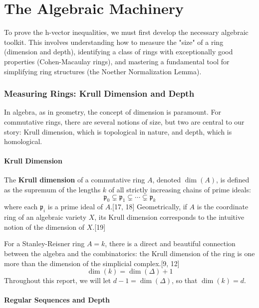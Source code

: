 \documentclass[11pt]{article}
\begin{document}
\part{The Algebraic Machinery}

To prove the h-vector inequalities, we must first develop the necessary algebraic toolkit. This involves understanding how to measure the "size" of a ring (dimension and depth), identifying a class of rings with exceptionally good properties (Cohen-Macaulay rings), and mastering a fundamental tool for simplifying ring structures (the Noether Normalization Lemma).

\section{Measuring Rings: Krull Dimension and Depth}

In algebra, as in geometry, the concept of dimension is paramount. For commutative rings, there are several notions of size, but two are central to our story: Krull dimension, which is topological in nature, and depth, which is homological.

\subsection{Krull Dimension}

The \textbf{Krull dimension} of a commutative ring $A$, denoted $\dim(A)$, is defined as the supremum of the lengths $k$ of all strictly increasing chains of prime ideals:
\[\mathfrak{p}_0 \subsetneq \mathfrak{p}_1 \subsetneq \cdots \subsetneq \mathfrak{p}_k\]
where each $\mathfrak{p}_i$ is a prime ideal of $A$.[17, 18] Geometrically, if $A$ is the coordinate ring of an algebraic variety $X$, its Krull dimension corresponds to the intuitive notion of the dimension of $X$.[19]

For a Stanley-Reisner ring $A = k$, there is a direct and beautiful connection between the algebra and the combinatorics: the Krull dimension of the ring is one more than the dimension of the simplicial complex.[9, 12]
\[\dim(k) = \dim(\Delta) + 1\]
Throughout this report, we will let $d-1 = \dim(\Delta)$, so that $\dim(k) = d$.

\subsection{Regular Sequences and Depth}
\end{document}

